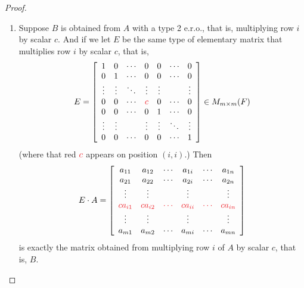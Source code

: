 \begin{proof}
\begin{enumerate}
\item
Suppose \(B\) is obtained from \(A\) with a type 2 e.r.o., that is, multiplying row \(i\) by scalar \(c\).
And if we let \(E\) be the same type of elementary matrix that multiplies row \(i\) by scalar \(c\),
that is,
\[
    E = \left[\begin{array}{ccccccc}
        1 & 0 & \cdots & 0 & 0 & \cdots & 0 \\
        0 & 1 & \cdots & 0 & 0 & \cdots & 0 \\
        \vdots & \vdots & \ddots & \vdots & \vdots & & \vdots \\
        0 & 0 & \cdots & \RED{c} & 0 & \cdots & 0 \\
        0 & 0 & \cdots & 0 & 1 & \cdots & 0 \\
        \vdots & \vdots & & \vdots & \vdots & \ddots & \vdots \\
        0 & 0 & \cdots & 0 & 0 & \cdots & 1
    \end{array}\right] \in M_{m \X m}(F)
\]
(where that red \(\RED{c}\) appears on position \((i, i)\).)
Then
\[
    E \cdot A=\left[\begin{array}{cccccc}
        a_{11} & a_{12} & \cdots & a_{1 i} & \cdots & a_{1 n} \\
        a_{21} & a_{22} & \cdots & a_{2 i} & \cdots & a_{2 n} \\
        \vdots & \vdots & & \vdots & & \vdots \\
        \RED{c a_{i 1}} &  \RED{c a_{i 2}} & \RED{\cdots} & \RED{c a_{i i}} & \RED{\cdots} & \RED{c a_{i n}} \\
        \vdots & \vdots & & \vdots & & \vdots \\
        a_{m 1} & a_{m 2} & \cdots & a_{m i} & \cdots & a_{m n}
    \end{array}\right]
\]
is exactly the matrix obtained from multiplying row \(i\) of \(A\) by scalar \(c\), that is, \(B\).


\end{enumerate}
\end{proof}
